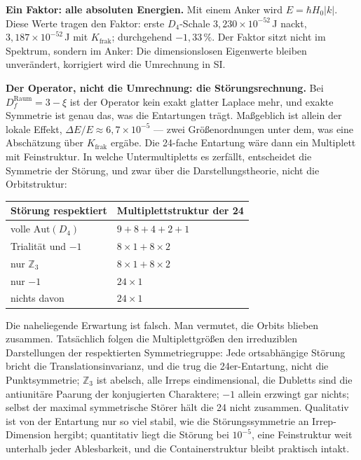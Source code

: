 \textbf{Ein Faktor: alle absoluten Energien.} Mit einem Anker wird
$E = \hbar H_0|k|$. Diese Werte tragen den Faktor: erste $D_4$-Schale
$3{,}230\times10^{-52}$\,J nackt, $3{,}187\times10^{-52}$\,J mit
$K_{\mathrm{frak}}$; durchgehend $-1{,}33\,\%$. Der Faktor sitzt nicht im
Spektrum, sondern im Anker: Die dimensionslosen Eigenwerte bleiben
unverändert, korrigiert wird die Umrechnung in SI.

\textbf{Der Operator, nicht die Umrechnung: die Störungsrechnung.} Bei
$D_f^{\mathrm{Raum}} = 3-\xi$ ist der Operator kein exakt glatter
Laplace mehr, und exakte Symmetrie ist genau das, was die Entartungen
trägt. Maßgeblich ist allein der lokale Effekt, $\Delta E/E\approx
6{,}7\times10^{-5}$ --- zwei Größenordnungen unter dem, was eine
Abschätzung über $K_{\mathrm{frak}}$ ergäbe. Die 24-fache Entartung
wäre dann ein Multiplett mit Feinstruktur. In welche Untermultipletts es
zerfällt, entscheidet die Symmetrie der Störung, und zwar über die
Darstellungstheorie, nicht die Orbitstruktur:

\begin{center}
\small
\begin{tabular}{lp{3.6cm}}
\toprule
Störung respektiert & Multiplettstruktur der 24 \\
\midrule
volle $\mathrm{Aut}(D_4)$ & $9+8+4+2+1$ \\
Trialität und $-1$ & $8\times1+8\times2$ \\
nur $\mathbb{Z}_3$ & $8\times1+8\times2$ \\
nur $-1$ & $24\times1$ \\
nichts davon & $24\times1$ \\
\bottomrule
\end{tabular}
\end{center}

Die naheliegende Erwartung ist falsch. Man vermutet, die Orbits blieben
zusammen. Tatsächlich folgen die Multiplettgrößen den irreduziblen
Darstellungen der respektierten Symmetriegruppe: Jede ortsabhängige
Störung bricht die Translationsinvarianz, und die trug die
24er-Entartung, nicht die Punktsymmetrie; $\mathbb{Z}_3$ ist abelsch, alle
Irreps eindimensional, die Dubletts sind die antiunitäre Paarung der
konjugierten Charaktere; $-1$ allein erzwingt gar nichts; selbst der
maximal symmetrische Störer hält die 24 nicht zusammen. Qualitativ ist
von der Entartung nur so viel stabil, wie die Störungssymmetrie an
Irrep-Dimension hergibt; quantitativ liegt die Störung bei $10^{-5}$,
eine Feinstruktur weit unterhalb jeder Ablesbarkeit, und die
Containerstruktur bleibt praktisch intakt.

